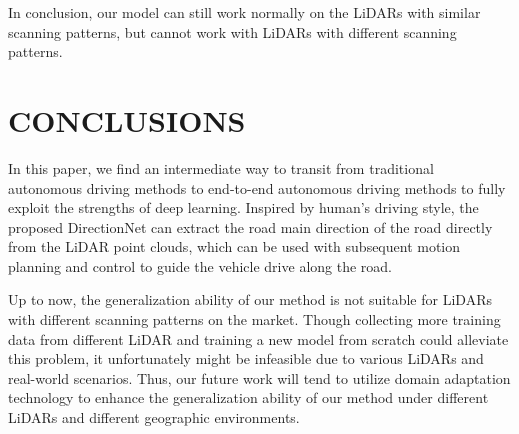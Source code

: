\documentclass[letterpaper,10 pt,conference]{ieeeconf}  %
\begin{document}
In conclusion, our model can still work normally on the LiDARs with similar scanning patterns, but cannot work with LiDARs with different scanning patterns.

\section{CONCLUSIONS}\label{conclusions}
In this paper, we find an intermediate way to transit from traditional autonomous driving methods to end-to-end autonomous driving methods to fully exploit the strengths of deep learning. Inspired by human's driving style, the proposed DirectionNet can extract the road main direction of the road directly from the LiDAR point clouds, which can be used with subsequent motion planning and control to guide the vehicle drive along the road.

Up to now, the generalization ability of our method is not suitable for LiDARs with different scanning patterns on the market. Though collecting more training data from different LiDAR and training a new model from scratch could alleviate this problem, it unfortunately might be infeasible due to various LiDARs and real-world scenarios. Thus, our future work will tend to utilize domain adaptation technology\cite{DA} to enhance the generalization ability of our method under different LiDARs and different geographic environments.
\addtolength{\textheight}{-0cm}


\end{document}
